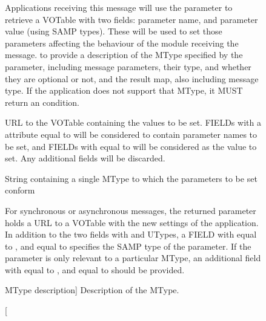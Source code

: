 		\begin{figure}[tbp]
			\centering
			\begin{minipage}{0.9\textwidth}
			\begin{framed}
					{
					Applications receiving this message will use
					the  parameter to retrieve a
					VOTable with two fields: parameter name,
					and parameter value (using SAMP types). These
					will be used to set those parameters affecting
					the behaviour of the module receiving the
					message.
					to provide a description of the MType
					specified by the  parameter,
					including message parameters, their type, and
					whether they are optional or not, and the result
					map, also including message type. If the
					application does not support that MType, it MUST
					return an \samperror{} condition.
					}
					{
						{
						URL to the VOTable containing the values to
						be set. FIELDs with a 
						attribute equal to
						 will be
						considered to contain parameter names to be
						set, and FIELDs with  equal
						to  will be
						considered as the value to set. Any
						additional fields will be discarded.
						}

						{String containing a single MType to which
						the parameters to be set conform}
					}
					{
						{
						For synchronous or asynchronous messages,
						the returned  parameter holds a
						URL to a VOTable with the new settings of
						the application. In addition to the two
						fields with 
						and 
						U\-Types, a FIELD with  equal
						to , and  equal
						to  specifies
						the SAMP type of the parameter. If the
						parameter is only relevant to a particular
						MType, an additional field with
						 equal to , and
						 equal to 
						should be provided.
						}
					}
			\end{framed}
			\end{minipage}
			\caption
			[ MType description]
			{Description of the 
			MType.}
			\label{fig:movoirConfigurationSetMtype}
		\end{figure}
		
